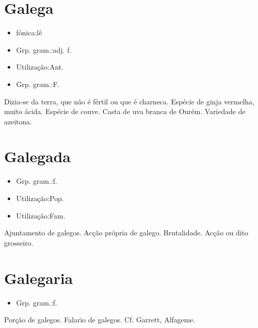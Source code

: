 \section{Galega}
\begin{itemize}
\item {fónica:lê}
\end{itemize}
\begin{itemize}
\item {Grp. gram.:adj. f.}
\end{itemize}
\begin{itemize}
\item {Utilização:Ant.}
\end{itemize}
\begin{itemize}
\item {Grp. gram.:F.}
\end{itemize}
Dizia-se da terra, que não é fértil ou que é charneca.
Espécie de ginja vermelha, muito ácida.
Espécie de couve.
Casta de uva branca de Ourém.
Variedade de azeitona.
\section{Galegada}
\begin{itemize}
\item {Grp. gram.:f.}
\end{itemize}
\begin{itemize}
\item {Utilização:Pop.}
\end{itemize}
\begin{itemize}
\item {Utilização:Fam.}
\end{itemize}
Ajuntamento de galegos.
Acção própria de galego.
Brutalidade.
Acção ou dito grosseiro.
\section{Galegaria}
\begin{itemize}
\item {Grp. gram.:f.}
\end{itemize}
Porção de galegos.
Falario de galegos. Cf. Garrett, \textunderscore Alfageme\textunderscore .
